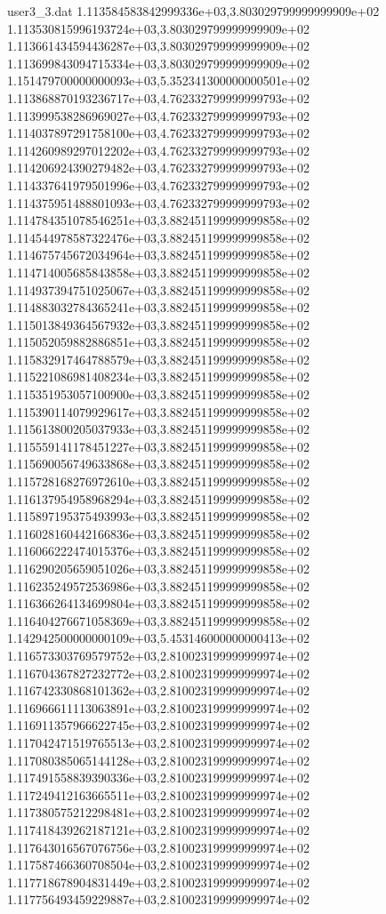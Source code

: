 \begin{filecontents}{user3_3.dat}
1.113584583842999336e+03,3.803029799999999909e+02
1.113530815996193724e+03,3.803029799999999909e+02
1.113661434594436287e+03,3.803029799999999909e+02
1.113699843094715334e+03,3.803029799999999909e+02
1.151479700000000093e+03,5.352341300000000501e+02
1.113868870193236717e+03,4.762332799999999793e+02
1.113999538286969027e+03,4.762332799999999793e+02
1.114037897291758100e+03,4.762332799999999793e+02
1.114260989297012202e+03,4.762332799999999793e+02
1.114206924390279482e+03,4.762332799999999793e+02
1.114337641979501996e+03,4.762332799999999793e+02
1.114375951488801093e+03,4.762332799999999793e+02
1.114784351078546251e+03,3.882451199999999858e+02
1.114544978587322476e+03,3.882451199999999858e+02
1.114675745672034964e+03,3.882451199999999858e+02
1.114714005685843858e+03,3.882451199999999858e+02
1.114937394751025067e+03,3.882451199999999858e+02
1.114883032784365241e+03,3.882451199999999858e+02
1.115013849364567932e+03,3.882451199999999858e+02
1.115052059882886851e+03,3.882451199999999858e+02
1.115832917464788579e+03,3.882451199999999858e+02
1.115221086981408234e+03,3.882451199999999858e+02
1.115351953057100900e+03,3.882451199999999858e+02
1.115390114079929617e+03,3.882451199999999858e+02
1.115613800205037933e+03,3.882451199999999858e+02
1.115559141178451227e+03,3.882451199999999858e+02
1.115690056749633868e+03,3.882451199999999858e+02
1.115728168276972610e+03,3.882451199999999858e+02
1.116137954958968294e+03,3.882451199999999858e+02
1.115897195375493993e+03,3.882451199999999858e+02
1.116028160442166836e+03,3.882451199999999858e+02
1.116066222474015376e+03,3.882451199999999858e+02
1.116290205659051026e+03,3.882451199999999858e+02
1.116235249572536986e+03,3.882451199999999858e+02
1.116366264134699804e+03,3.882451199999999858e+02
1.116404276671058369e+03,3.882451199999999858e+02
1.142942500000000109e+03,5.453146000000000413e+02
1.116573303769579752e+03,2.810023199999999974e+02
1.116704367827232772e+03,2.810023199999999974e+02
1.116742330868101362e+03,2.810023199999999974e+02
1.116966611113063891e+03,2.810023199999999974e+02
1.116911357966622745e+03,2.810023199999999974e+02
1.117042471519765513e+03,2.810023199999999974e+02
1.117080385065144128e+03,2.810023199999999974e+02
1.117491558839390336e+03,2.810023199999999974e+02
1.117249412163665511e+03,2.810023199999999974e+02
1.117380575212298481e+03,2.810023199999999974e+02
1.117418439262187121e+03,2.810023199999999974e+02
1.117643016567076756e+03,2.810023199999999974e+02
1.117587466360708504e+03,2.810023199999999974e+02
1.117718678904831449e+03,2.810023199999999974e+02
1.117756493459229887e+03,2.810023199999999974e+02

\end{filecontents}
